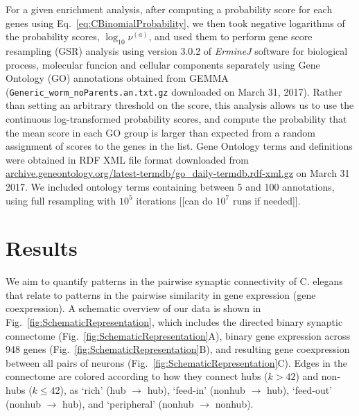 \documentclass[10pt,letterpaper]{article}
\begin{document}
For a given enrichment analysis, after computing a probability score for each genes using Eq.~\eqref{eq:CBinomialProbability}, we then took negative logarithms of the probability scores, $\log_{10}\nu^{(a)}$, and used them to perform gene score resampling (GSR) analysis using version 3.0.2 of \emph{ErmineJ} software \cite{Gillis2010} for biological process, molecular funcion and cellular components separately using Gene Ontology (GO) annotations \cite{Ashburner2000} obtained from GEMMA \cite{Zoubarev2012} (\texttt{Generic\_worm\_noParents.an.txt.gz} downloaded on March 31, 2017).
Rather than setting an arbitrary threshold on the score, this analysis allows us to use the continuous log-transformed probability scores, and compute the probability that the mean score in each GO group is larger than expected from a random assignment of scores to the genes in the list.
Gene Ontology terms and definitions were obtained in RDF XML file format downloaded from \url{archive.geneontology.org/latest-termdb/go_daily-termdb.rdf-xml.gz} on March 31 2017.
We included ontology terms containing between 5 and 100 annotations, using full resampling with $10^{5}$ iterations [[can do $10^{7}$ runs if needed]].


\section*{Results}

We aim to quantify patterns in the pairwise synaptic connectivity of C. elegans that relate to patterns in the pairwise similarity in gene expression (gene coexpression).
A schematic overview of our data is shown in Fig.~\ref{fig:SchematicRepresentation}, which includes the directed binary synaptic connectome (Fig.~\ref{fig:SchematicRepresentation}A), binary gene expression across 948 genes (Fig.~\ref{fig:SchematicRepresentation}B), and resulting gene coexpression between all pairs of neurons (Fig.~\ref{fig:SchematicRepresentation}C).
Edges in the connectome are colored according to how they connect hubs ($k > 42$) and non-hubs ($k \leq 42$), as `rich' (hub $\rightarrow$ hub), `feed-in' (nonhub $\rightarrow$ hub), `feed-out' (nonhub $\rightarrow$ hub), and `peripheral' (nonhub $\rightarrow$ nonhub).
\end{document}
